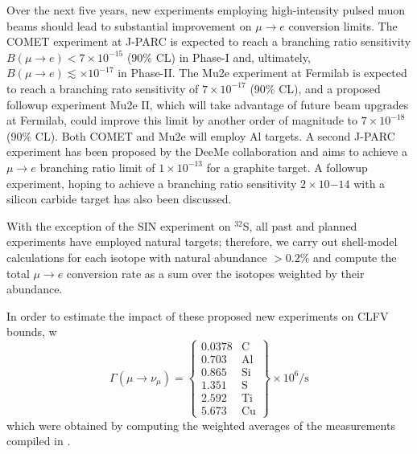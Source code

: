 \documentclass{book}[letterpaper,12pt]
\begin{document}
Over the next five years, new experiments employing high-intensity pulsed muon beams should lead to substantial improvement on $\mu\rightarrow e$ conversion limits. The COMET experiment at J-PARC is expected to reach a branching ratio sensitivity $B(\mu\rightarrow e)<7\times 10^{-15}$ (90\% CL) in Phase-I and, ultimately, $B(\mu\rightarrow e)\lesssim\times 10^{-17}$ in Phase-II. The Mu2e experiment at Fermilab is expected to reach a branching rato sensitivity of $7\times 10^{-17}$ (90\% CL), and a proposed followup experiment Mu2e II, which will take advantage of future beam upgrades at Fermilab, could improve this limit by another order of magnitude to $7\times 10^{-18}$ (90\% CL). Both COMET and Mu2e will employ Al targets. A second J-PARC experiment has been proposed by the DeeMe collaboration and aims to achieve a $\mu\rightarrow e$ branching ratio limit of $1\times 10^{-13}$ for a graphite target. A followup experiment, hoping to achieve a branching ratio sensitivity $2\times 10{-14}$ with a silicon carbide target has also been discussed.

With the exception of the SIN experiment on $^{32}$S, all past and planned experiments have employed natural targets; therefore, we carry out shell-model calculations for each isotope with natural abundance $>0.2\%$ and compute the total $\mu\rightarrow e$ conversion rate as a sum over the isotopes weighted by their abundance.

In order to estimate the impact of these proposed new experiments on CLFV bounds, w
\begin{equation}
\Gamma\left(\mu\rightarrow\nu_{\mu}\right)=\left\{\begin{array}{lr}
0.0378 & \mathrm{C}\\
0.703 & \mathrm{Al}\\
0.865 & \mathrm{Si}\\
1.351 & \mathrm{S}\\
2.592 & \mathrm{Ti}\\
5.673 & \mathrm{Cu}
\end{array}\right\}\times 10^6\mathrm{/s}
\end{equation}
which were obtained by computing the weighted averages of the measurements compiled in \cite{PhysRevC.35.2212}.   
\end{document}
